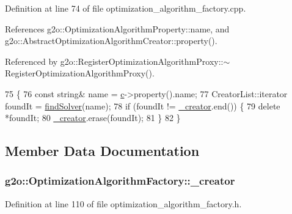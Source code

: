 Definition at line 74 of file optimization\+\_\+algorithm\+\_\+factory.\+cpp.



References g2o\+::\+Optimization\+Algorithm\+Property\+::name, and g2o\+::\+Abstract\+Optimization\+Algorithm\+Creator\+::property().



Referenced by g2o\+::\+Register\+Optimization\+Algorithm\+Proxy\+::$\sim$\+Register\+Optimization\+Algorithm\+Proxy().


\begin{DoxyCode}
75   \{
76     \textcolor{keyword}{const} \textcolor{keywordtype}{string}& name = \hyperlink{sparse__block__matrix_8hpp_a4e1e0e72dd773439e333c84dd762a9c3}{c}->property().name;
77     CreatorList::iterator foundIt = \hyperlink{classg2o_1_1OptimizationAlgorithmFactory_a8e37aaa37f66f7f5e3bdd8a3c8bf58c6}{findSolver}(name);
78     \textcolor{keywordflow}{if} (foundIt != \hyperlink{classg2o_1_1OptimizationAlgorithmFactory_a1d7f67d60df0d0b26a7694dcea4879db}{\_creator}.end()) \{
79       \textcolor{keyword}{delete} *foundIt;
80       \hyperlink{classg2o_1_1OptimizationAlgorithmFactory_a1d7f67d60df0d0b26a7694dcea4879db}{\_creator}.erase(foundIt);
81     \}
82   \}
\end{DoxyCode}


\subsection{Member Data Documentation}
\subsubsection[{\texorpdfstring{\+\_\+creator}{_creator}}]{ g2o\+::\+Optimization\+Algorithm\+Factory\+::\+\_\+creator\hspace{0.3cm}{\ttfamily [protected]}}\hypertarget{classg2o_1_1OptimizationAlgorithmFactory_a1d7f67d60df0d0b26a7694dcea4879db}{}\label{classg2o_1_1OptimizationAlgorithmFactory_a1d7f67d60df0d0b26a7694dcea4879db}


Definition at line 110 of file optimization\+\_\+algorithm\+\_\+factory.\+h.

